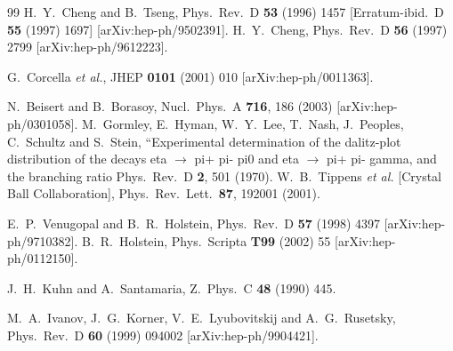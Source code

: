 \documentclass{article}
\begin{document}
\begin{thebibliography}{99}
  H.~Y.~Cheng and B.~Tseng,
  Phys.\ Rev.\  D {\bf 53} (1996) 1457
  [Erratum-ibid.\  D {\bf 55} (1997) 1697]
  [arXiv:hep-ph/9502391].
  H.~Y.~Cheng,
  Phys.\ Rev.\  D {\bf 56} (1997) 2799
  [arXiv:hep-ph/9612223].

  G.~Corcella {\it et al.},
  JHEP {\bf 0101} (2001) 010
  [arXiv:hep-ph/0011363].

  N.~Beisert and B.~Borasoy,
  Nucl.\ Phys.\  A {\bf 716}, 186 (2003)
  [arXiv:hep-ph/0301058].
  M.~Gormley, E.~Hyman, W.~Y.~Lee, T.~Nash, J.~Peoples, C.~Schultz and S.~Stein,
   ``Experimental determination of the dalitz-plot distribution of the decays
   eta $\to$ pi+ pi- pi0 and eta $\to$ pi+ pi- gamma, and the branching ratio
  Phys.\ Rev.\  D {\bf 2}, 501 (1970).
  W.~B.~Tippens {\it et al.}  [Crystal Ball Collaboration],
  Phys.\ Rev.\ Lett.\  {\bf 87}, 192001 (2001).

 E.~P.~Venugopal and B.~R.~Holstein,
Phys.\ Rev.\  D {\bf 57} (1998) 4397 [arXiv:hep-ph/9710382].
 B.~R.~Holstein,
 Phys.\ Scripta {\bf T99} (2002) 55 [arXiv:hep-ph/0112150].

 J.~H.~Kuhn and A.~Santamaria,
Z.\ Phys.\  C {\bf 48} (1990) 445.

M.~A.~Ivanov, J.~G.~Korner, V.~E.~Lyubovitskij and A.~G.~Rusetsky,
Phys.\ Rev.\  D {\bf 60} (1999) 094002
[arXiv:hep-ph/9904421].

\end{thebibliography}
\end{document}
